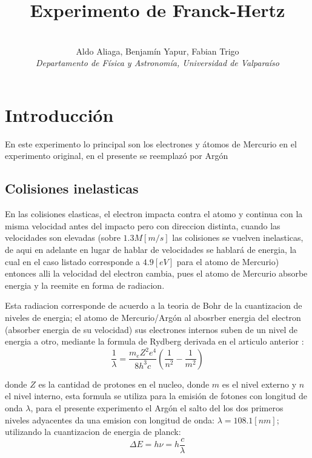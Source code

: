 \documentclass[a4paper,twocolumn,10pt]{article}
\begin{document}
\title{Experimento de Franck-Hertz}
\author{ \\Aldo Aliaga, Benjamín Yapur, Fabian Trigo \\ \textit{Departamento de Física y Astronomía, Universidad de Valparaíso}}
\twocolumn[
  \begin{@twocolumnfalse}
    \maketitle
    \begin{abstract}
  
    \end{abstract}
  \end{@twocolumnfalse}\bigskip]

\vspace{2cm}

\section{Introducción}
En este experimento lo principal son los electrones y átomos de Mercurio en el experimento original, en el presente se reemplazó por Argón
\subsection{Colisiones inelasticas}
En las colisiones elasticas, el electron impacta contra el atomo y continua con la misma velocidad antes del impacto pero con direccion distinta, cuando las velocidades son elevadas (sobre $1.3 M [m/s]$ las colisiones se vuelven inelasticas, de aqui en adelante en lugar de hablar de velocidades se hablará de energia, la cual en el caso listado corresponde a $4.9 [eV]$ para el atomo de Mercurio) entonces alli la velocidad del electron cambia, pues el atomo de Mercurio absorbe energia y la reemite en forma de radiacion.

Esta radiacion corresponde de acuerdo a la teoria de Bohr \cite{bohr} de la cuantizacion de niveles de energia; el atomo de Mercurio/Argón al abosrber energia del electron (absorber energia de su velocidad) sus electrones internos suben de un nivel de energia a otro, mediante la formula de Rydberg derivada en el articulo anterior \cite{rydberguv}:
\begin{equation}\label{eq:rydberg}
    \frac{1}{\lambda} = \frac{m_e Z^2 e^4}{8 h^3 c} (
    \frac{1}{n^2} - \frac{1}{m^2}    
    )
\end{equation}

donde $Z$ es la cantidad de protones en el nucleo, donde $m$ es el nivel externo y $n$ el nivel interno, esta formula se utiliza para la emisión de fotones con longitud de onda $\lambda$, para el presente experimento el Argón el salto del los dos primeros niveles adyacentes da una emision con longitud de onda: $\lambda = 108.1 [nm]$; utilizando la cuantizacion de energia de planck:
\begin{equation}\label{eq:planck}
    \Delta E = h \nu = h\frac{c}{\lambda}
\end{equation}
\end{document}
